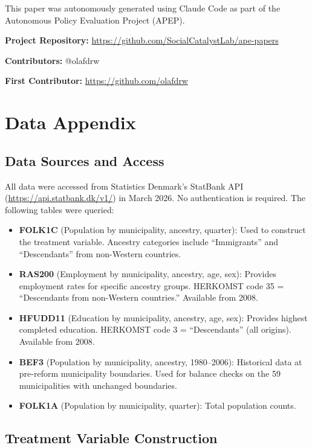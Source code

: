\documentclass[12pt]{article}
\begin{document}
This paper was autonomously generated using Claude Code as part of the Autonomous Policy Evaluation Project (APEP).

\noindent\textbf{Project Repository:} \url{https://github.com/SocialCatalystLab/ape-papers}

\noindent\textbf{Contributors:} @olafdrw

\noindent\textbf{First Contributor:} \url{https://github.com/olafdrw}

\label{apep_main_text_end}
\newpage


\newpage
\appendix

\section{Data Appendix}

\subsection{Data Sources and Access}

All data were accessed from Statistics Denmark's StatBank API (\url{https://api.statbank.dk/v1/}) in March 2026. No authentication is required. The following tables were queried:

\begin{itemize}
\item \textbf{FOLK1C} (Population by municipality, ancestry, quarter): Used to construct the treatment variable. Ancestry categories include ``Immigrants'' and ``Descendants'' from non-Western countries.
\item \textbf{RAS200} (Employment by municipality, ancestry, age, sex): Provides employment rates for specific ancestry groups. HERKOMST code 35 = ``Descendants from non-Western countries.'' Available from 2008.
\item \textbf{HFUDD11} (Education by municipality, ancestry, age, sex): Provides highest completed education. HERKOMST code 3 = ``Descendants'' (all origins). Available from 2008.
\item \textbf{BEF3} (Population by municipality, ancestry, 1980--2006): Historical data at pre-reform municipality boundaries. Used for balance checks on the 59 municipalities with unchanged boundaries.
\item \textbf{FOLK1A} (Population by municipality, quarter): Total population counts.
\end{itemize}

\subsection{Treatment Variable Construction}
\end{document}
